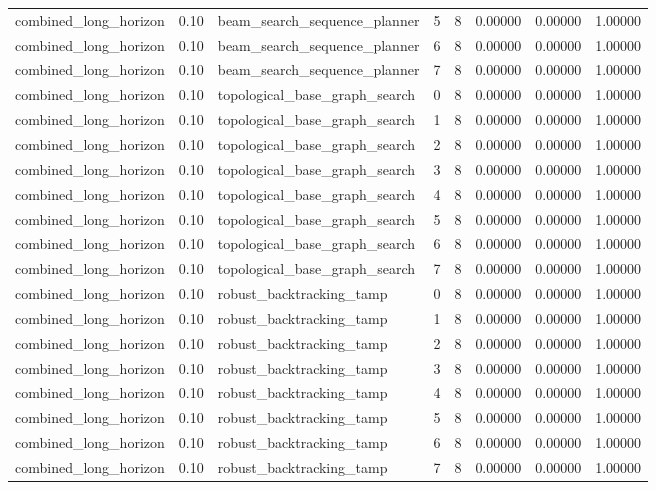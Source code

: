 \documentclass{article}
\begin{document}
\begin{table}[tbp]
{\begin{tabular}{llllllll}
combined\_long\_horizon & 0.10 & beam\_search\_sequence\_planner & 5 & 8 & 0.00000 & 0.00000 & 1.00000 \\
combined\_long\_horizon & 0.10 & beam\_search\_sequence\_planner & 6 & 8 & 0.00000 & 0.00000 & 1.00000 \\
combined\_long\_horizon & 0.10 & beam\_search\_sequence\_planner & 7 & 8 & 0.00000 & 0.00000 & 1.00000 \\
combined\_long\_horizon & 0.10 & topological\_base\_graph\_search & 0 & 8 & 0.00000 & 0.00000 & 1.00000 \\
combined\_long\_horizon & 0.10 & topological\_base\_graph\_search & 1 & 8 & 0.00000 & 0.00000 & 1.00000 \\
combined\_long\_horizon & 0.10 & topological\_base\_graph\_search & 2 & 8 & 0.00000 & 0.00000 & 1.00000 \\
combined\_long\_horizon & 0.10 & topological\_base\_graph\_search & 3 & 8 & 0.00000 & 0.00000 & 1.00000 \\
combined\_long\_horizon & 0.10 & topological\_base\_graph\_search & 4 & 8 & 0.00000 & 0.00000 & 1.00000 \\
combined\_long\_horizon & 0.10 & topological\_base\_graph\_search & 5 & 8 & 0.00000 & 0.00000 & 1.00000 \\
combined\_long\_horizon & 0.10 & topological\_base\_graph\_search & 6 & 8 & 0.00000 & 0.00000 & 1.00000 \\
combined\_long\_horizon & 0.10 & topological\_base\_graph\_search & 7 & 8 & 0.00000 & 0.00000 & 1.00000 \\
combined\_long\_horizon & 0.10 & robust\_backtracking\_tamp & 0 & 8 & 0.00000 & 0.00000 & 1.00000 \\
combined\_long\_horizon & 0.10 & robust\_backtracking\_tamp & 1 & 8 & 0.00000 & 0.00000 & 1.00000 \\
combined\_long\_horizon & 0.10 & robust\_backtracking\_tamp & 2 & 8 & 0.00000 & 0.00000 & 1.00000 \\
combined\_long\_horizon & 0.10 & robust\_backtracking\_tamp & 3 & 8 & 0.00000 & 0.00000 & 1.00000 \\
combined\_long\_horizon & 0.10 & robust\_backtracking\_tamp & 4 & 8 & 0.00000 & 0.00000 & 1.00000 \\
combined\_long\_horizon & 0.10 & robust\_backtracking\_tamp & 5 & 8 & 0.00000 & 0.00000 & 1.00000 \\
combined\_long\_horizon & 0.10 & robust\_backtracking\_tamp & 6 & 8 & 0.00000 & 0.00000 & 1.00000 \\
combined\_long\_horizon & 0.10 & robust\_backtracking\_tamp & 7 & 8 & 0.00000 & 0.00000 & 1.00000 \\
\bottomrule
\end{tabular}
}
\end{table}
\end{document}

